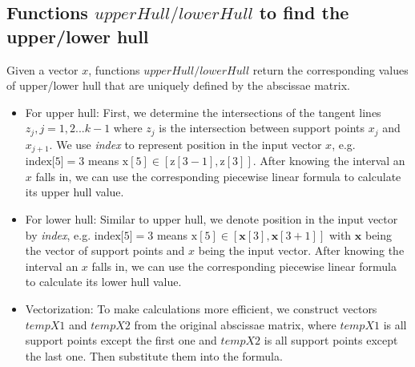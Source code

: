 \documentclass{article}\usepackage[]{graphicx}\usepackage[]{color}
\begin{document}
\subsection{Functions $upperHull/lowerHull$ to find the upper/lower hull}

Given a vector $x$, functions $upperHull/lowerHull$ return the corresponding values of upper/lower hull that are uniquely defined by the abscissae matrix.
\begin{itemize}
\item For upper hull: First, we determine the intersections of the tangent lines {\em $z_j, j=1,2...k-1$} where $z_j$ is the intersection between support points $x_j$ and $x_{j+1}$. We use {\em index} to represent position in the input vector $x$, e.g. $\textrm{index[5]} = 3$ means $\mathrm{x[5] \in [ z[3-1], z[3] ]}$. After knowing the interval an $x$ falls in, we can use the corresponding piecewise linear formula to calculate its upper hull value.
\item For lower hull: Similar to upper hull, we denote position in the input vector by {\em index}, e.g. $\textrm{index[5]} = 3$ means $\mathrm{x[5] \in [ \mathbf{x}[3], \mathbf{x}[3+1] ]}$ with $\mathbf{x}$ being the vector of support points and $x$ being the input vector. After knowing the interval an $x$ falls in, we can use the corresponding piecewise linear formula to calculate its lower hull value.
\item Vectorization: To make calculations more efficient, we construct vectors $tempX1$ and $tempX2$ from the original abscissae matrix, where $tempX1$ is all support points except the first one and $tempX2$ is all support points except the last one. Then substitute them into the formula.
\end{itemize}
\end{document}
